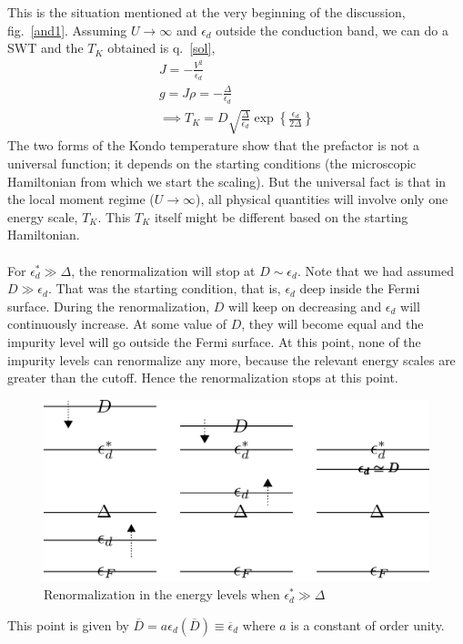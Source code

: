 \documentclass[twoside]{report}
\numberwithin{equation}{section}
\begin{document}
This is the situation mentioned at the very beginning of the discussion, fig.~\ref{and1}.
Assuming \(U \rightarrow \infty\) and \(\epsilon_d\) outside the conduction band, we can do a SWT and the \(T_K\) obtained is q.~\ref{sol},
\begin{gather}
    J = -\frac{V^2}{\epsilon_d}\\
    g = J\rho = -\frac{\Delta}{\epsilon_d}\\
    \implies T_K = D\sqrt{\frac{\Delta}{\epsilon_d}}\exp\left\{\frac{\epsilon_d}{2\Delta}\right\}\label{jean2}
\end{gather}
The two forms of the Kondo temperature show that the prefactor is not a universal function; it depends on the starting conditions (the microscopic Hamiltonian from which we start the scaling).
But the universal fact is that in the local moment regime (\(U \rightarrow \infty\)), all physical quantities will involve only one energy scale, \(T_K\).
This \(T_K\) itself might be different based on the starting Hamiltonian.\\\\
For \(\epsilon_d^* \gg \Delta\), the renormalization will stop at \(D \sim \epsilon_d\).
Note that we had assumed \(D \gg \epsilon_d\).
That was the starting condition, that is, \(\epsilon_d\) deep inside the Fermi surface.
During the renormalization, \(D\) will keep on decreasing and \(\epsilon_d\) will continuously increase.
At some value of \(D\), they will become equal and the impurity level will go outside the Fermi surface.
At this point, none of the impurity levels can renormalize any more, because the relevant energy scales are greater than the cutoff.
Hence the renormalization stops at this point.
\begin{figure} \centering \includegraphics[scale=0.29]{../figures/full.png}\caption{Renormalization in the energy levels when \(\epsilon_d^* \gg \Delta\)}\end{figure}
This point is given by \(\overline D = a\epsilon_d(\overline D) \equiv \overline \epsilon_d\) where \(a\) is a constant of order unity.
\end{document}
